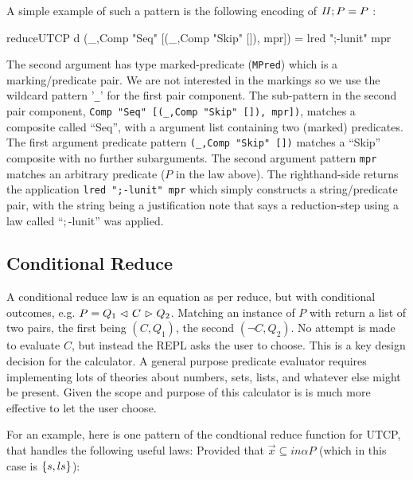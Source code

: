 A simple example of such a pattern is the following encoding
of $\mathit{II};P = P$ :
\begin{code}
reduceUTCP d
 (_,Comp "Seq" [(_,Comp "Skip" []), mpr]) = lred ";-lunit" mpr
\end{code}
The second argument has type marked-predicate (\texttt{MPred})
which is a marking/predicate pair.
We are not interested in the markings
so we use the wildcard pattern '\verb"_"'
for the first pair component.
The sub-pattern in the second pair component,
\verb'Comp "Seq" [(_,Comp "Skip" []), mpr])',
matches a composite called ``Seq'',
with a argument list containing two (marked) predicates.
The first argument predicate pattern \verb'(_,Comp "Skip" [])'
matches a ``Skip'' composite with no further subarguments.
The second argument pattern \verb'mpr' matches an arbitrary predicate
($P$ in the law above).
The righthand-side returns the application \verb'lred ";-lunit" mpr'
which simply constructs a string/predicate pair,
with the string being a justification note that says a reduction-step
using a law called ``$;$-lunit'' was applied.


\subsection{Conditional Reduce}

A conditional reduce law is an equation as per reduce,
but with conditional outcomes, e.g. $P = Q_1 \mathrel{\lhd ~ {C} ~ \rhd} Q_2$.
Matching an instance of $P$ with return a list of two pairs,
the first being $(C,Q_1)$, the second $(\lnot C,Q_2)$.
No attempt is made to evaluate $C$, but instead the REPL
asks the user to choose.
This is a key design decision for the calculator.
A general purpose predicate evaluator requires implementing
lots of theories about numbers, sets, lists,
and whatever else might be present.
Given the scope and purpose of this calculator is is
much more effective to let the user choose.

For an example,
here is one pattern of the condtional reduce
function for UTCP, that handles the following useful laws:
Provided that $\vec x \subseteq in\alpha P$
 (which in this case is $\{{s,ls}\}$):



